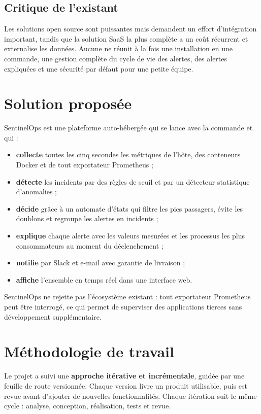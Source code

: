 \subsection{Critique de l'existant}

Les solutions open source sont puissantes mais demandent un effort d'intégration important,
tandis que la solution SaaS la plus complète a un coût récurrent et externalise les données.
Aucune ne réunit à la fois une installation en une commande, une gestion complète du cycle de
vie des alertes, des alertes expliquées et une sécurité par défaut pour une petite équipe.

\section{Solution proposée}

SentinelOps est une plateforme auto-hébergée qui se lance avec la commande  et
qui :
\begin{itemize}
  \item \textbf{collecte} toutes les cinq secondes les métriques de l'hôte, des conteneurs
        Docker et de tout exportateur Prometheus ;
  \item \textbf{détecte} les incidents par des règles de seuil et par un détecteur
        statistique d'anomalies ;
  \item \textbf{décide} grâce à un automate d'états qui filtre les pics passagers, évite les
        doublons et regroupe les alertes en incidents ;
  \item \textbf{explique} chaque alerte avec les valeurs mesurées et les processus les plus
        consommateurs au moment du déclenchement ;
  \item \textbf{notifie} par Slack et e-mail avec garantie de livraison ;
  \item \textbf{affiche} l'ensemble en temps réel dans une interface web.
\end{itemize}

SentinelOps ne rejette pas l'écosystème existant : tout exportateur Prometheus peut être
interrogé, ce qui permet de superviser des applications tierces sans développement
supplémentaire.

\section{Méthodologie de travail}

Le projet a suivi une \textbf{approche itérative et incrémentale}, guidée par une feuille de
route versionnée. Chaque version livre un produit utilisable, puis est revue avant d'ajouter
de nouvelles fonctionnalités. Chaque itération suit le même cycle : analyse, conception,
réalisation, tests et revue.

